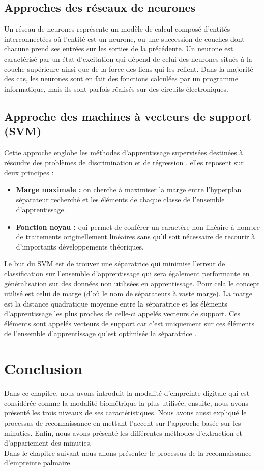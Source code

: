 \subsection{Approches des réseaux de neurones }
\label{NN}
Un réseau de neurones représente un modèle de calcul composé d'entités interconnectées où l'entité est un neurone, ou une succession de couches dont chacune prend ses entrées sur les sorties de la précédente. Un neurone est caractérisé par un état d'excitation qui dépend de celui des neurones situés à la couche supérieure ainsi que de la force des liens qui les relient. Dans la majorité des cas, les neurones sont en fait des fonctions calculées par un programme informatique, mais ils sont parfois réalisés sur des circuits électroniques.
\subsection{Approche des machines à vecteurs de support (SVM) }
\label{SVM}
Cette approche englobe les méthodes d'apprentissage supervisées destinées à résoudre des problèmes de discrimination et de régression \citep{honeine2007methodes}, elles reposent sur deux principes :
\begin{itemize}
	\item \textbf{Marge maximale : }on cherche à maximiser la marge entre l'hyperplan séparateur recherché et les éléments de chaque classe de l'ensemble d'apprentissage.
	\item \textbf{Fonction noyau :} qui permet de conférer un caractère non-linéaire à nombre de traitements originellement linéaires sans qu'il soit nécessaire de recourir à d'importants développements théoriques.
\end{itemize}
Le but du SVM est de trouver une séparatrice qui minimise l'erreur de classification sur l'ensemble d'apprentissage qui sera également performante en généralisation sur des données non utilisées en apprentissage. Pour cela le concept utilisé est celui de marge (d'où le nom de séparateurs à vaste marge). La marge est la distance quadratique moyenne entre la séparatrice et les éléments d'apprentissage les plus proches de celle-ci appelés vecteurs de support. Ces éléments sont appelés vecteurs de support car c'est uniquement sur ces éléments de l'ensemble d'apprentissage qu'est optimisée la séparatrice \citep{belahcene2012comparaison}.



\section{Conclusion}

Dans ce chapitre, nous avons introduit la modalité d'empreinte digitale qui est considérée comme la modalité biométrique la plus utilisée, ensuite, nous avons présenté les trois niveaux de ses caractéristiques. Nous avons aussi expliqué le processus de reconnaissance en mettant l'accent sur l'approche basée sur les minuties. Enfin, nous avons présenté les différentes méthodes d'extraction et d'appariement des minuties. 
\\Dans le chapitre suivant nous allons présenter le processus de la reconnaissance d'empreinte palmaire.
